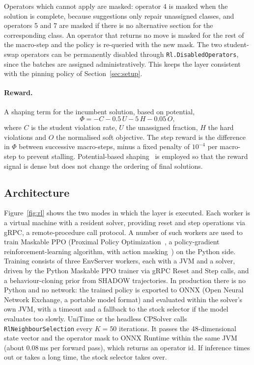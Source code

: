 Operators which cannot apply are masked: operator 4 is masked when the solution is complete,
because suggestions only repair unassigned classes, and operators 5 and 7 are masked if there is
no alternative section for the corresponding class. An operator that returns no move is masked for
the rest of the macro-step and the policy is re-queried with the new mask. The two student-swap
operators can be permanently disabled through \texttt{Rl.DisabledOperators}, since the batches are
assigned administratively. This keeps the layer consistent with the pinning policy of
Section~\ref{sec:setup}.

\paragraph{Reward.} A shaping term for the incumbent solution, based on potential,
\[
  \Phi = -C - 0.5\,U - 5\,H - 0.05\,O ,
\]
where $C$ is the student violation rate, $U$ the unassigned fraction, $H$ the hard violations and
$O$ the normalised soft objective. The step reward is the difference in $\Phi$ between successive
macro-steps, minus a fixed penalty of $10^{-4}$ per macro-step to prevent stalling.
Potential-based shaping~\cite{ng1999shaping} is employed so that the reward signal is dense but
does not change the ordering of final solutions.

\subsection{Architecture}

Figure~\ref{fig:rl} shows the two modes in which the layer is executed. Each worker is a virtual
machine with a resident solver, providing reset and step operations via gRPC, a remote-procedure
call protocol. A number of such workers are used to train Maskable PPO (Proximal Policy
Optimization~\cite{schulman2017ppo}, a policy-gradient reinforcement-learning algorithm, with
action masking~\cite{schulte2017maskable}) on the Python side. Training consists of three
EnvServer workers, each with a JVM and a solver, driven by the Python Maskable PPO trainer via
gRPC Reset and Step calls, and a behaviour-cloning prior from SHADOW trajectories. In production
there is no Python and no network: the trained policy is exported to ONNX (Open Neural Network
Exchange, a portable model format) and evaluated within the solver's own JVM, with a timeout and a
fallback to the stock selector if the model evaluates too slowly. UniTime or the headless CPSolver
calls \texttt{RlNeighbourSelection} every $K = 50$ iterations. It passes the 48-dimensional state
vector and the operator mask to ONNX Runtime within the same JVM (about 0.08\,ms per forward
pass), which returns an operator id. If inference times out or takes a long time, the stock
selector takes over.

